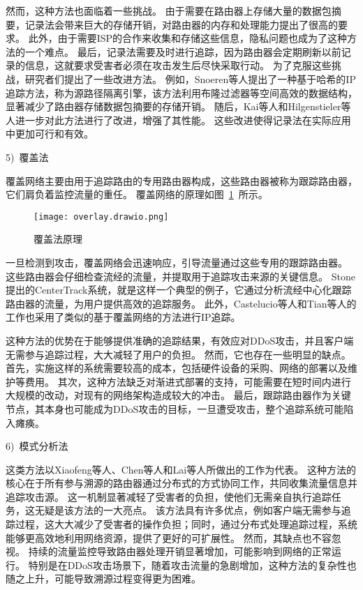 然而，这种方法也面临着一些挑战。
由于需要在路由器上存储大量的数据包摘要，记录法会带来巨大的存储开销，对路由器的内存和处理能力提出了很高的要求。
此外，由于需要ISP的合作来收集和存储这些信息，隐私问题也成为了这种方法的一个难点。
最后，记录法需要及时进行追踪，因为路由器会定期刷新以前记录的信息，这就要求受害者必须在攻击发生后尽快采取行动。
为了克服这些挑战，研究者们提出了一些改进方法。
例如，Snoeren等人\cite{Snoeren2001}提出了一种基于哈希的IP追踪方法，称为源路径隔离引擎，该方法利用布隆过滤器等空间高效的数据结构，显著减少了路由器存储数据包摘要的存储开销。
随后，Kai等人\cite{Kai2009}和Hilgenstieler等人\cite{Hilgenstieler2010}进一步对此方法进行了改进，增强了其性能。
这些改进使得记录法在实际应用中更加可行和有效。\par

5)~覆盖法\par
覆盖网络主要由用于追踪路由的专用路由器构成，这些路由器被称为跟踪路由器，它们肩负着监控流量的重任。
覆盖网络的原理如图~\ref{fig:overlay}~所示。
\begin{figure}[htbp]
  \centering
  \texttt{[image: overlay.drawio.png]}
  \caption{覆盖法原理}
  \label{fig:overlay}
\end{figure}
一旦检测到攻击，覆盖网络会迅速响应，引导流量通过这些专用的跟踪路由器。
这些路由器会仔细检查流经的流量，并提取用于追踪攻击来源的关键信息。
Stone提出的CenterTrack系统，就是这样一个典型的例子，它通过分析流经中心化跟踪路由器的流量，为用户提供高效的追踪服务\cite{stone2000centertrack}。
此外，Castelucio等人\cite{castelucio2009aslevel}和Tian等人\cite{tian2011easytrace}的工作也采用了类似的基于覆盖网络的方法进行IP追踪。\par

这种方法的优势在于能够提供准确的追踪结果，有效应对DDoS攻击，并且客户端无需参与追踪过程，大大减轻了用户的负担。
然而，它也存在一些明显的缺点。
首先，实施这样的系统需要较高的成本，包括硬件设备的采购、网络的部署以及维护等费用。
其次，这种方法缺乏对渐进式部署的支持，可能需要在短时间内进行大规模的改动，对现有的网络架构造成较大的冲击。
最后，跟踪路由器作为关键节点，其本身也可能成为DDoS攻击的目标，一旦遭受攻击，整个追踪系统可能陷入瘫痪。


6)~模式分析法\par
这类方法以Xiaofeng等人\cite{xiaofeng2004mechanism}、Chen等人\cite{chen2006tracing}和Lai等人\cite{lai2008antbased}所做出的工作为代表。
这种方法的核心在于所有参与溯源的路由器通过分布式的方式协同工作，共同收集流量信息并追踪攻击源。
这一机制显著减轻了受害者的负担，使他们无需亲自执行追踪任务，这无疑是该方法的一大亮点。
该方法具有许多优点，例如客户端无需参与追踪过程，这大大减少了受害者的操作负担；同时，通过分布式处理追踪过程，系统能够更高效地利用网络资源，提供了更好的可扩展性。
然而，其缺点也不容忽视。
持续的流量监控导致路由器处理开销显著增加，可能影响到网络的正常运行。
特别是在DDoS攻击场景下，随着攻击流量的急剧增加，这种方法的复杂性也随之上升，可能导致溯源过程变得更为困难。

